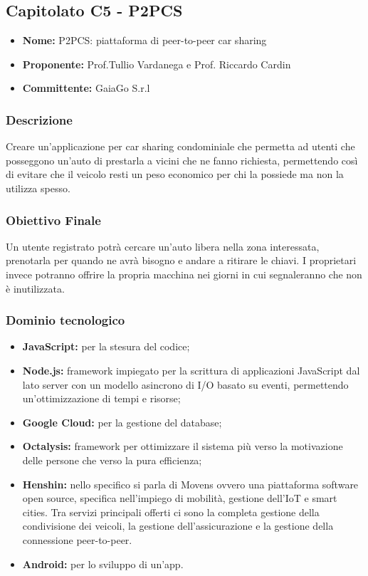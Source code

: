 \subsection{Capitolato C5 - P2PCS}
\begin{itemize}
\item \textbf{Nome:} P2PCS: piattaforma di peer-to-peer car sharing
\item \textbf{Proponente:} Prof.Tullio Vardanega e Prof.
Riccardo Cardin
	\item \textbf{Committente:} GaiaGo S.r.l
\end{itemize}
\subsubsection{Descrizione}
Creare un'applicazione per car sharing condominiale che permetta ad utenti che posseggono un'auto di prestarla a vicini che ne fanno richiesta, permettendo così di evitare che il veicolo resti un peso economico per chi la possiede ma non la utilizza spesso.
\subsubsection{Obiettivo Finale}
Un utente registrato potrà cercare un'auto libera nella zona interessata, prenotarla per quando ne avrà bisogno e andare a ritirare le chiavi. I proprietari invece potranno offrire la propria macchina nei giorni in cui segnaleranno che non è inutilizzata.
\subsubsection{Dominio tecnologico}
\begin{itemize}
	\item \textbf{JavaScript:} per la stesura del codice;
	\item \textbf{Node.js:} framework impiegato per la scrittura di applicazioni JavaScript dal lato server con un modello asincrono di I/O basato su eventi, permettendo un'ottimizzazione di tempi e risorse;
	\item \textbf{Google Cloud:} per la gestione del database;
	\item \textbf{Octalysis:} framework per ottimizzare il sistema più verso la motivazione delle persone che verso la pura efficienza;
	\item \textbf{Henshin:} nello specifico si parla di Movens ovvero una piattaforma software open source, specifica nell'impiego di mobilità, gestione dell'IoT e smart cities. Tra servizi principali offerti ci sono la completa gestione della condivisione dei veicoli, la gestione dell'assicurazione e la gestione della connessione peer-to-peer.
	\item \textbf{Android:} per lo sviluppo di un'app.
\end{itemize}

